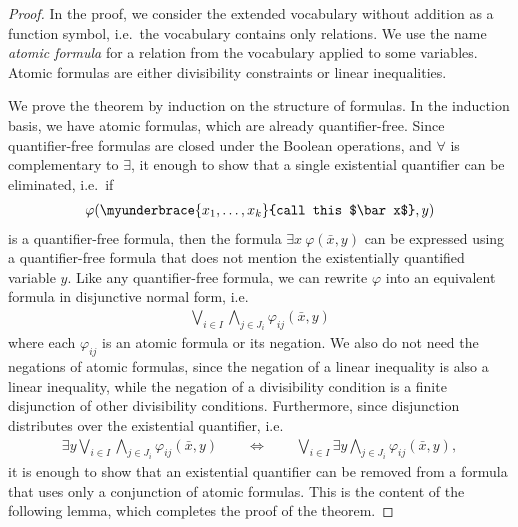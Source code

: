 \begin{proof}
	 In the proof, we consider the extended vocabulary without addition as a function symbol, i.e.~the vocabulary contains only relations. We use the name \emph{atomic formula} for a relation from the vocabulary applied to some variables. Atomic formulas are either divisibility constraints or linear inequalities.

	 We prove the theorem by induction on the structure of formulas. In the induction basis, we have atomic formulas, which are already quantifier-free.  
	Since quantifier-free formulas are closed under the Boolean operations, and $\forall$ is complementary to $\exists$, it enough to show that a single existential quantifier can be eliminated, i.e.~if
	\begin{align*}
	\varphi(\myunderbrace{x_1,\ldots,x_k}{call this $\bar x$},y)
	\end{align*}
	is a quantifier-free formula, then the formula $\exists x \ \varphi(\bar x,y)$ 
	can be expressed using a quantifier-free formula that does not mention the existentially quantified variable $y$. Like any quantifier-free formula, we can rewrite $\varphi$ into an equivalent formula in disjunctive normal form, i.e.~
	\begin{align*}
	\bigvee_{i \in I} \bigwedge_{j \in J_i} \varphi_{ij}(\bar x,y)
	\end{align*}
	where each $\varphi_{ij}$ is an atomic formula or its negation. We also do not need the negations of atomic formulas, since the negation of a linear inequality is also a linear inequality, while the negation of a divisibility condition is a finite disjunction of other divisibility conditions. Furthermore, since disjunction distributes over the existential quantifier, i.e.
	\begin{align*}
		\exists y \bigvee_{i \in I} \bigwedge_{j \in J_i} \varphi_{ij}(\bar x,y) 
		\qquad \iff \qquad 
		\bigvee_{i \in I} \exists y \bigwedge_{j \in J_i} \varphi_{ij}(\bar x,y),
	\end{align*}
	it is enough to show that an existential quantifier can be removed from a formula that uses only a conjunction of atomic formulas. This is the content of the following lemma, which completes the proof of the theorem.


\end{proof}
